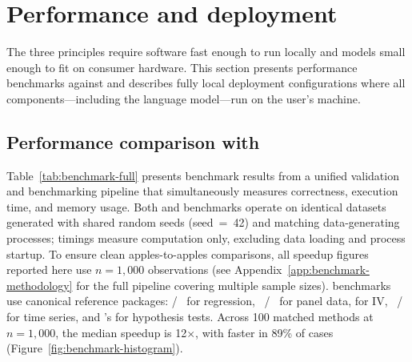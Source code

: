 
\section{Performance and deployment} \label{sec:deployment}

The three principles require software fast enough to run locally and
models small enough to fit on consumer hardware. This section presents
performance benchmarks against  and describes fully local
deployment configurations where all components---including the language
model---run on the user's machine.

\subsection[Performance comparison with R]{Performance comparison with }

Table~\ref{tab:benchmark-full} presents benchmark results from a unified
validation and benchmarking pipeline that simultaneously measures
correctness, execution time, and memory usage. Both  and
 benchmarks operate on identical datasets generated with
shared random seeds (seed~=~42) and matching data-generating processes;
timings measure computation only, excluding data loading and process
startup. To ensure clean apples-to-apples comparisons, all speedup
figures reported here use $n = 1{,}000$ observations (see
Appendix~\ref{app:benchmark-methodology} for the full pipeline covering
multiple sample sizes).
 benchmarks use canonical reference packages:
/~\citep{Zeileis:2004} for regression,
~\citep{Croissant+Millo:2008}/~\citep{Gaure:2013}
for panel data,  for IV,
~\citep{Hyndman+Khandakar:2008}/ for time
series, and 's  for hypothesis tests.
Across 100 matched methods at $n = 1{,}000$, the median speedup is
12$\times$, with  faster in 89\% of cases
(Figure~\ref{fig:benchmark-histogram}).

